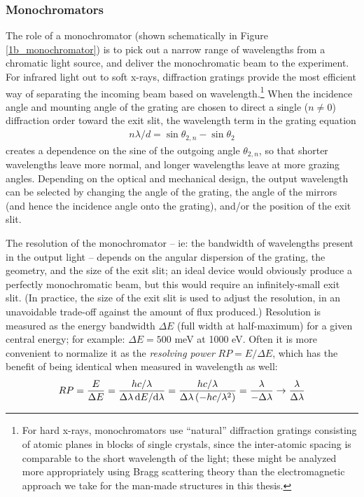 \subsubsection{Monochromators}
The role of a monochromator (shown schematically in Figure \ref{1b_monochromator}) is to pick out a narrow range of wavelengths from a chromatic light source, and deliver the monochromatic beam to the experiment.  For infrared light out to soft x-rays, diffraction gratings provide the most efficient way of separating the incoming beam based on wavelength.\footnote{For hard x-rays, monochromators use ``natural'' diffraction gratings consisting of atomic planes in blocks of single crystals, since the inter-atomic spacing is comparable to the short wavelength of the light; these might be analyzed more appropriately using Bragg scattering theory than the electromagnetic approach we take for the man-made structures in this thesis.}  When the incidence angle and mounting angle of the grating are chosen to direct a single ($n\neq0$) diffraction order toward the exit slit, the wavelength term in the grating equation 
\begin{eqnarray*}
n\lambda / d = \sin\theta_{2,n} - \sin\theta_{2}
\end{eqnarray*}
creates a dependence on the sine of the outgoing angle $\theta_{2,n}$, so that shorter wavelengths leave more normal, and longer wavelengths leave at more grazing angles.  Depending on the optical and mechanical design, the output wavelength can be selected by changing the angle of the grating, the angle of the mirrors (and hence the incidence angle onto the grating), and/or the position of the exit slit.

The resolution of the monochromator  -- ie: the bandwidth of wavelengths present in the output light -- depends on the angular dispersion of the grating, the geometry, and the size of the exit slit; an ideal device would obviously produce a perfectly monochromatic beam, but this would require an infinitely-small exit slit.  (In practice, the size of the exit slit is used to adjust the resolution, in an unavoidable trade-off against the amount of flux produced.)  Resolution is measured as the energy bandwidth $\Delta E$ (full width at half-maximum) for a given central energy; for example: $\Delta E = 500$ meV at 1000 eV.   Often it is more convenient to normalize it as the \emph{resolving power} $RP = E/\Delta E$, which has the benefit of being identical when measured in wavelength as well:
\begin{align}
RP = \frac{E}{\Delta E} = \frac{hc/\lambda}{\Delta \lambda \, \mathrm{d} E/\mathrm{d} \lambda} = \frac{hc/\lambda}{\Delta \lambda\, (-hc / \lambda^2)} =  \frac{\lambda}{-\Delta \lambda} \rightarrow \frac{\lambda}{\Delta \lambda}
\end{align}

